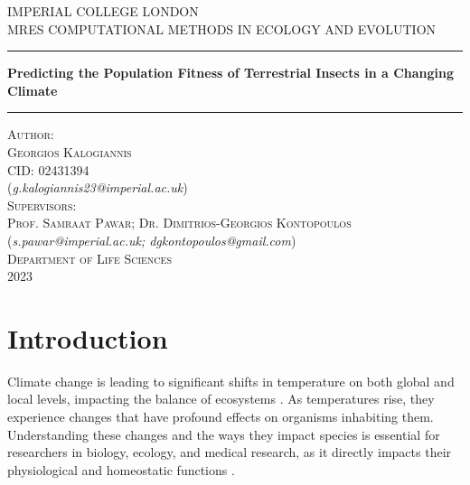 \documentclass[11pt]{article}
\begin{document}
\begin{titlepage}
\centering\Large

{\LARGE I}MPERIAL {\LARGE C}OLLEGE {\LARGE L}ONDON\\
\vspace{1in}
\large
{\Large MR}ES {\Large C}OMPUTATIONAL {\Large M}ETHODS IN {\Large E}COLOGY AND {\Large E}VOLUTION\\
\vspace{1in}

\hrule height 0.05cm
\Large
\vspace{0.45in}
\textbf{\LARGE Predicting the Population Fitness of Terrestrial Insects in a Changing Climate}
\vspace{0.45in}
\hrule height 0.05cm

\vspace{1in}
\Large
\textsc{ Author:\\
Georgios Kalogiannis\\
CID: 02431394}\\
(\textit{g.kalogiannis23@imperial.ac.uk})\\
\vspace{0.5in}
\textsc{Supervisors:\\
Prof. Samraat Pawar;  Dr. Dimitrios-Georgios Kontopoulos}\\
(\textit{s.pawar@imperial.ac.uk; dgkontopoulos@gmail.com})\\

\vspace{4.5cm}
\textsc{Department of Life Sciences}\\
2023
\end{titlepage}
\pagebreak

\linenumbers
\doublespacing
%
\section{Introduction}
Climate change is leading to significant shifts in temperature on both global and local levels, impacting the balance of ecosystems \citep{Abbass2022Review}. As temperatures rise, they experience changes that have profound effects on organisms inhabiting them. Understanding these changes and the ways they impact species is essential for researchers in biology, ecology, and medical research, as it directly impacts their physiological and homeostatic functions \citep{Seebacher2023Physiology}. 
\end{document}
